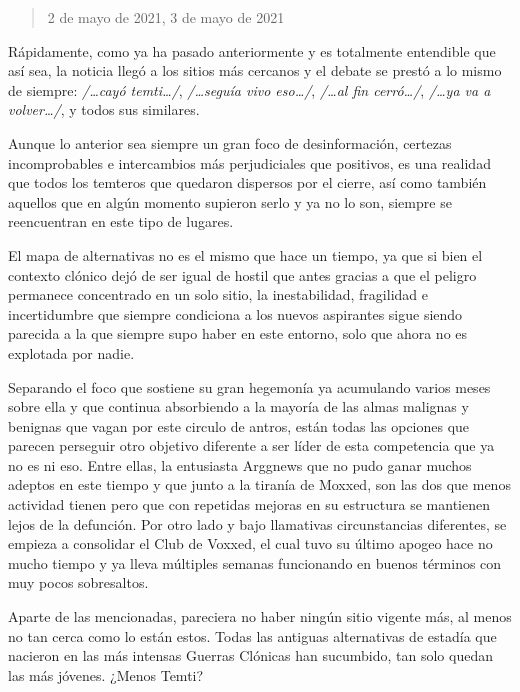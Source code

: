 \documentclass[
]{book}
\begin{document}
\begin{quote}
2 de mayo de 2021, 3 de mayo de 2021
\end{quote}

Rápidamente, como ya ha pasado anteriormente y es totalmente entendible que así sea, la noticia llegó a los sitios más cercanos y el debate se prestó a lo mismo de siempre: \emph{/\ldots cayó temti\ldots/}, \emph{/\ldots seguía vivo eso\ldots/}, \emph{/\ldots al fin cerró\ldots/}, \emph{/\ldots ya va a volver\ldots/}, y todos sus similares.

Aunque lo anterior sea siempre un gran foco de desinformación, certezas incomprobables e intercambios más perjudiciales que positivos, es una realidad que todos los temteros que quedaron dispersos por el cierre, así como también aquellos que en algún momento supieron serlo y ya no lo son, siempre se reencuentran en este tipo de lugares.

El mapa de alternativas no es el mismo que hace un tiempo, ya que si bien el contexto clónico dejó de ser igual de hostil que antes gracias a que el peligro permanece concentrado en un solo sitio, la inestabilidad, fragilidad e incertidumbre que siempre condiciona a los nuevos aspirantes sigue siendo parecida a la que siempre supo haber en este entorno, solo que ahora no es explotada por nadie.

Separando el foco que sostiene su gran hegemonía ya acumulando varios meses sobre ella y que continua absorbiendo a la mayoría de las almas malignas y benignas que vagan por este circulo de antros, están todas las opciones que parecen perseguir otro objetivo diferente a ser líder de esta competencia que ya no es ni eso. Entre ellas, la entusiasta Arggnews que no pudo ganar muchos adeptos en este tiempo y que junto a la tiranía de Moxxed, son las dos que menos actividad tienen pero que con repetidas mejoras en su estructura se mantienen lejos de la defunción. Por otro lado y bajo llamativas circunstancias diferentes, se empieza a consolidar el Club de Voxxed, el cual tuvo su último apogeo hace no mucho tiempo y ya lleva múltiples semanas funcionando en buenos términos con muy pocos sobresaltos.

Aparte de las mencionadas, pareciera no haber ningún sitio vigente más, al menos no tan cerca como lo están estos. Todas las antiguas alternativas de estadía que nacieron en las más intensas Guerras Clónicas han sucumbido, tan solo quedan las más jóvenes. ¿Menos Temti?
\end{document}

